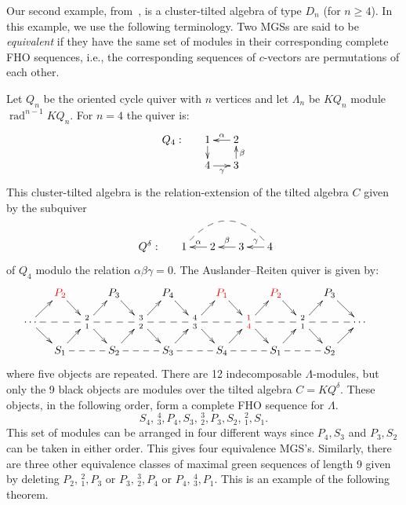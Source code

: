 \documentclass[ALCO,ThmDefs,Unicode,epreuves]{cedram}
\DeclareMathOperator{\rad}{rad}
\begin{document}
Our second example, from~\cite{AI}, is a cluster-tilted algebra of type $D_n$ (for $n\ge4$). In this example, we use the following terminology. Two MGSs are said to be \emph{equivalent} if they have the same set of modules in their corresponding complete FHO sequences, i.e., the corresponding sequences of $c$-vectors are permutations of each other.
\begin{exam}[\cite{AI}]\label{eg: Dn}
Let $Q_n$ be the oriented cycle quiver with $n$ vertices and let $\Lambda_n$ be $KQ_n$ module $\rad ^{n-1}KQ_n$. For $n=4$ the quiver is:
\[
\xymatrixrowsep{10pt}\xymatrixcolsep{15pt}
\xymatrix{%
Q_4: &1\ar[d]& 2\ar[l]_\alpha \\
&4\ar[r]_\gamma & 3\ar[u]_\beta	}%
\]
This cluster-tilted algebra is the relation-extension of the tilted algebra $C$ given by the subquiver
\[
\raisebox{-5mm}{\xymatrixrowsep{15pt}\xymatrixcolsep{15pt}
\xymatrix{%
	Q^\delta:&1\ar@{--}@/^2pc/[rrr] &2\ar[l]_{\alpha}&3\ar[l]_{\beta}&4\ar[l]_{\gamma}
	}%
}\]
of $Q_4$ modulo the relation $\alpha\beta\gamma=0$. The Auslander--Reiten quiver is given by:
\[
\xymatrixrowsep{10pt}\xymatrixcolsep{10pt}
\xymatrix{%
&\color{red}P_2\ar[dr]&& P_3 \ar[dr]&& P_4 \ar[dr]&& \color{red}P_1 \ar[dr]&& \color{red}P_2\ar[dr] && P_3\ar[dr] && \\
\cdots\ar[ru]\ar[rd]\ar@{--}[rr]&&%
\genfrac{}{}{0pt}{1}{2}{1}
\ar@{--}[rr]\ar[ru]\ar[rd]&& %
\genfrac{}{}{0pt}{1}{3}{2}
\ar[ru]\ar@{--}[rr]\ar[rd]&& %
\genfrac{}{}{0pt}{1}{4}{3}
\ar@{--}[rr]\ar[ru]\ar[rd]&& \color{red}\genfrac{}{}{0pt}{1}{1}{4}
\ar@{--}[rr]\ar[ru]\ar[rd]&& \genfrac{}{}{0pt}{1}{2}{1}
\ar@{--}[rr]\ar[ru]\ar[rd]&&\cdots \\
&S_1\ar[ru]\ar@{--}[rr]&& S_2\ar[ru]\ar@{--}[rr]&&S_3\ar[ru]\ar@{--}[rr]&&S_4\ar[ru]\ar@{--}[rr]&&S_1\ar[ru]\ar@{--}[rr]&&S_2\ar[ru]
	}%
\]
where five objects are repeated. There are 12 indecomposable $\Lambda$-modules, but only the 9 black objects are modules over the tilted algebra $C=KQ^\delta$. These objects, in the following order, form a complete FHO sequence for $\Lambda$.
\[
	S_4,{\,^4_3}, P_4,S_3, {\,^3_2}, P_3,S_2,{\,^2_1},S_1.
\]
This set of modules can be arranged in four different ways since $P_4,S_3$ and $P_3,S_2$ can be taken in either order. This gives four equivalence MGS's. Similarly, there are three other equivalence classes of maximal green sequences of length 9 given by deleting $P_2,{\,^2_1},P_3$ or $P_3,{\,^3_2},P_4$ or $P_4,{\,^4_3},P_1$. This is an example of the following theorem.
\end{exam}
\end{document}
